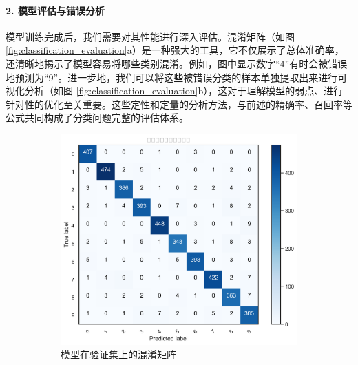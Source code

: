 \begin{itemize}
        \paragraph{2. 模型评估与错误分析}
        模型训练完成后，我们需要对其性能进行深入评估。混淆矩阵（如图 \ref{fig:classification_evaluation}a）是一种强大的工具，它不仅展示了总体准确率，还清晰地揭示了模型容易将哪些类别混淆。例如，图中显示数字“4”有时会被错误地预测为“9”。进一步地，我们可以将这些被错误分类的样本单独提取出来进行可视化分析（如图 \ref{fig:classification_evaluation}b），这对于理解模型的弱点、进行针对性的优化至关重要。这些定性和定量的分析方法，与前述的精确率、召回率等公式共同构成了分类问题完整的评估体系。
        
        \begin{figure}[H]
            \centering
            \begin{subfigure}[b]{0.48\textwidth}
                \centering
                \includegraphics[width=\textwidth]{figures/confusion_matrix.png}
                \caption{模型在验证集上的混淆矩阵}
                \label{fig:confusion_matrix}
            \end{subfigure}
            \hfill
            \begin{subfigure}[b]{0.48\textwidth}
                \centering

\end{subfigure}
\end{figure}
\end{itemize}
